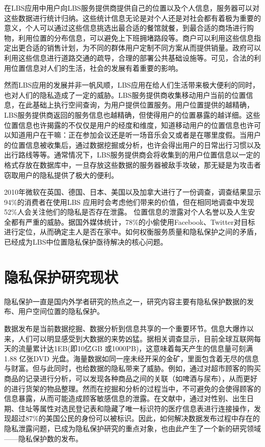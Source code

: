 在LBS应用中用户向LBS服务提供商提供自己的位置以及个人信息，服务器可以对这些数据进行统计归纳。这些统计信息无论是对个人还是对社会都有着极为重要的意义，个人可以通过这些信息挑选出最合适的餐馆就餐，到最合适的商场进行购物，利用位置的分布信息，可以避免上下班拥堵路段等。商户可以利用这些信息指定出更合适的销售计划，为不同的群体用户定制不同方案从而提供销量。政府可以利用这些信息进行道路交通的疏导，合理的部署公共基础设施等。可见，合法的利用位置信息对人们的生活，社会的发展有着重要的影响。


然而LBS应用的发展并非一帆风顺，LBS应用在给人们生活带来极大便利的同时，也对人们的隐私造成了一定的威胁。LBS服务提供商收集移动用户当前的位置信息，在此基础上执行空间查询，为用户提供位置服务。用户位置提供的越精确，LBS服务提供商返回的服务信息也越精确，但使得用户的位置暴露的越详细。这些位置信息也许揭露的不仅仅是用户的经度和维度，知道移动用户的位置信息也许可以知道用户在干嘛：正在参加会议还是听一场音乐会又或者是在哪里度假。当用户的位置信息被收集后，通过数据挖掘或分析，也许会得出用户的日常出行习惯以及出行路线等等。通常情况下，LBS服务提供商会将收集到的用户位置信息以一定的格式存放在数据库中，一旦存放这些数据的服务器被敌手攻破，那无疑是为攻击者窃取用户的隐私提供了极大的便利。

2010年微软在英国、德国、日本、美国以及加拿大进行了一份调查，调查结果显示94\%的消费者在使用LBS 应用时会考虑他们带来的价值，但在相同地调查中发现52\%人会关注他们的隐私是否存在泄露\cite{knn}。 位置信息的泄露对个人名誉以及人生安全都有严重的威胁。据国外媒体统计，78\%的小偷使用Facebook、Twitter对目标进行定位，从而确定主人是否在家中\cite{RSAInfo}。如何权衡服务质量和隐私保护之间的矛盾，已经成为LBS中位置隐私保护亟待解决的核心问题。
\section{隐私保护研究现状}
隐私保护一直是国内外学者研究的热点之一，研究内容主要有隐私保护数据的发布、用户空间位置的隐私保护。

数据发布是当前数据挖掘、数据分析到信息共享的一个重要环节。信息大爆炸以来，人们可以明显感受到大数据的来势凶猛。据相关调查显示，目前全球互联网每天的流量累计达1EB(即10亿GB 或1000PB)，这意味着每天产生的信息量可刻满1.88 亿张DVD 光盘。海量数据如同一座未经开采的金矿，里面包含着无尽的信息与财富。但与此同时，也给数据的隐私带来了威胁。例如，通过对超市顾客的购买商品的记录进行分析，可以发现各种商品之间的关联（如啤酒与尿布），从而更好的进行货架的物品整理。然而在挖掘和分析的过程当中，不可避免的会使得顾客的信息暴露，从而可能造成顾客敏感信息的泄露。在文献\cite{sweeney}中，通过对性别、出生日期、住址等属性对选民登记表和隐藏了唯一标识符的医疗信息表进行连接操作，发现超过87\%的美国公民的身份可以被标识。因此，如何解决数据发布过程中存在的隐私泄露问题，已成为隐私保护研究的重点对象，也由此产生了一个新的研究领域——隐私保护数的发布。

